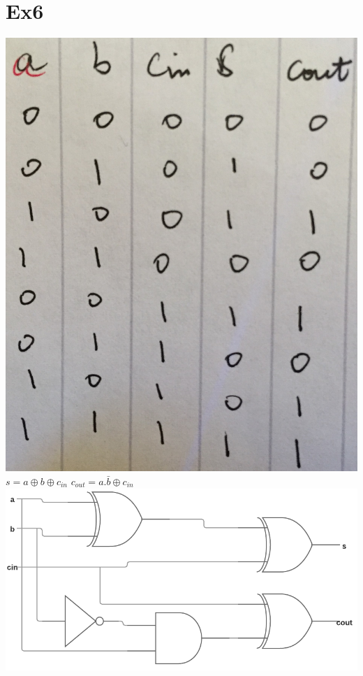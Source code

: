 \documentclass[10pt,twoside,a4paper]{article}
\begin{document}
\section{Ex6}

\includegraphics[scale=0.1]{6.JPG} \newline
$s=a\oplus b\oplus c_{in}$\newline
$c_{out}=a.\bar{b}\oplus c_{in}$\newline
\includegraphics[scale=1]{6(1).png} \newline
\end{document}
